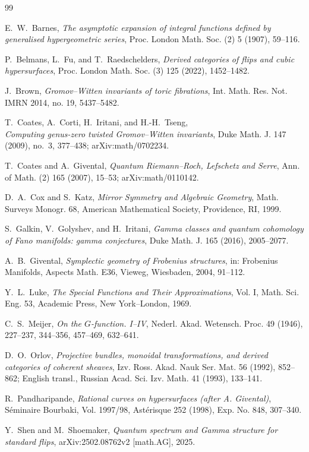 \documentclass[11pt]{article}
\theoremstyle{definition}
\theoremstyle{remark}
\begin{document}
\begin{thebibliography}{99}

E.~W.~Barnes,
\emph{The asymptotic expansion of integral functions defined by generalised
hypergeometric series},
Proc. London Math. Soc. (2) 5 (1907), 59--116.

P.~Belmans, L.~Fu, and T.~Raedschelders,
\emph{Derived categories of flips and cubic hypersurfaces},
Proc. London Math. Soc. (3) 125 (2022), 1452--1482.

J.~Brown,
\emph{Gromov--Witten invariants of toric fibrations},
Int. Math. Res. Not. IMRN 2014, no. 19, 5437--5482.

T.~Coates, A.~Corti, H.~Iritani, and H.-H.~Tseng,\\
\emph{Computing genus-zero twisted Gromov--Witten invariants},
Duke Math. J. 147 (2009), no.~3, 377--438; arXiv:math/0702234.

T.~Coates and A.~Givental,
\emph{Quantum Riemann--Roch, Lefschetz and Serre},
Ann. of Math. (2) 165 (2007), 15--53; arXiv:math/0110142.

D.~A.~Cox and S.~Katz,
\emph{Mirror Symmetry and Algebraic Geometry},
Math. Surveys Monogr. 68, American Mathematical Society, Providence, RI, 1999.

S.~Galkin, V.~Golyshev, and H.~Iritani,
\emph{Gamma classes and quantum cohomology of Fano manifolds: gamma
conjectures},
Duke Math. J. 165 (2016), 2005--2077.

A.~B.~Givental,
\emph{Symplectic geometry of Frobenius structures},
in: Frobenius Manifolds, Aspects Math. E36, Vieweg, Wiesbaden, 2004,
91--112.

Y.~L.~Luke,
\emph{The Special Functions and Their Approximations}, Vol. I,
Math. Sci. Eng. 53, Academic Press, New York--London, 1969.

C.~S.~Meijer,
\emph{On the \(G\)-function. I--IV},
Nederl. Akad. Wetensch. Proc. 49 (1946), 227--237, 344--356, 457--469,
632--641.

D.~O.~Orlov,
\emph{Projective bundles, monoidal transformations, and derived categories of
coherent sheaves},
Izv. Ross. Akad. Nauk Ser. Mat. 56 (1992), 852--862;
English transl., Russian Acad. Sci. Izv. Math. 41 (1993), 133--141.

R.~Pandharipande,
\emph{Rational curves on hypersurfaces (after A. Givental)},
S\'eminaire Bourbaki, Vol. 1997/98, Ast\'erisque 252 (1998), Exp. No. 848,
307--340.

Y.~Shen and M.~Shoemaker,
\emph{Quantum spectrum and Gamma structure for standard flips},
arXiv:2502.08762v2 [math.AG], 2025.

\end{thebibliography}
\end{document}
